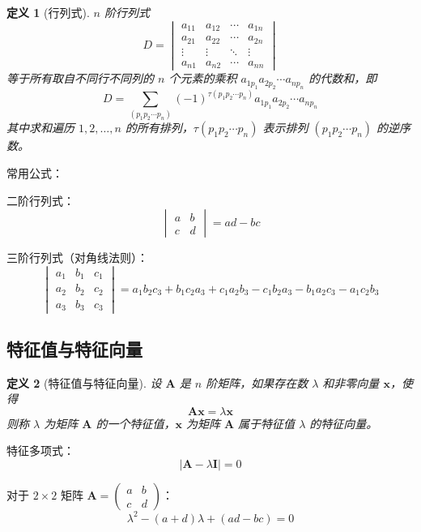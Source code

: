 \documentclass[12pt]{article}
\newtheorem{definition}{定义}
\begin{document}
\begin{definition}[行列式]
$n$ 阶行列式
$$D = \begin{vmatrix}
a_{11} & a_{12} & \cdots & a_{1n} \\
a_{21} & a_{22} & \cdots & a_{2n} \\
\vdots & \vdots & \ddots & \vdots \\
a_{n1} & a_{n2} & \cdots & a_{nn}
\end{vmatrix}$$
等于所有取自不同行不同列的 $n$ 个元素的乘积 $a_{1p_1} a_{2p_2} \cdots a_{np_n}$ 的代数和，即
$$D = \sum_{(p_1 p_2 \cdots p_n)} (-1)^{\tau(p_1 p_2 \cdots p_n)} a_{1p_1} a_{2p_2} \cdots a_{np_n}$$
其中求和遍历 $1, 2, \ldots, n$ 的所有排列，$\tau(p_1 p_2 \cdots p_n)$ 表示排列 $(p_1 p_2 \cdots p_n)$ 的逆序数。
\end{definition}

常用公式：

二阶行列式：
$$\begin{vmatrix} a & b \\ c & d \end{vmatrix} = ad - bc$$

三阶行列式（对角线法则）：
$$\begin{vmatrix}
a_1 & b_1 & c_1 \\
a_2 & b_2 & c_2 \\
a_3 & b_3 & c_3
\end{vmatrix} = a_1 b_2 c_3 + b_1 c_2 a_3 + c_1 a_2 b_3 - c_1 b_2 a_3 - b_1 a_2 c_3 - a_1 c_2 b_3$$

\subsection{特征值与特征向量}

\begin{definition}[特征值与特征向量]
设 $\mathbf{A}$ 是 $n$ 阶矩阵，如果存在数 $\lambda$ 和非零向量 $\mathbf{x}$，使得
$$\mathbf{A}\mathbf{x} = \lambda \mathbf{x}$$
则称 $\lambda$ 为矩阵 $\mathbf{A}$ 的一个特征值，$\mathbf{x}$ 为矩阵 $\mathbf{A}$ 属于特征值 $\lambda$ 的特征向量。
\end{definition}

特征多项式：
$$|\mathbf{A} - \lambda \mathbf{I}| = 0$$

对于 $2 \times 2$ 矩阵 $\mathbf{A} = \begin{pmatrix} a & b \\ c & d \end{pmatrix}$：
$$\lambda^2 - (a+d)\lambda + (ad-bc) = 0$$

\end{document}
